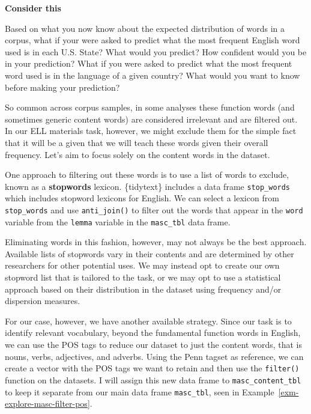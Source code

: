 \documentclass[
  letterpaper,
  krantz1]{latex/krantz-mod}
\theoremstyle{definition}
\theoremstyle{definition}
\theoremstyle{remark}
\begin{document}
\begin{tcolorbox}[enhanced jigsaw, toprule=.15mm, breakable, colback=white, arc=.35mm, left=2mm, colframe=quarto-callout-color-frame, opacityback=0, bottomrule=.15mm, rightrule=.15mm, leftrule=.75mm]

\textbf{ Consider this}

Based on what you now know about the expected distribution of words in a
corpus, what if your were asked to predict what the most frequent
English word used is in each U.S. State? What would you predict? How
confident would you be in your prediction? What if you were asked to
predict what the most frequent word used is in the language of a given
country? What would you want to know before making your prediction?

\end{tcolorbox}

So common across corpus samples, in some analyses these function words
(and sometimes generic content words) are considered irrelevant and are
filtered out. In our ELL materials task, however, we might exclude them
for the simple fact that it will be a given that we will teach these
words given their overall frequency. Let's aim to focus solely on the
content words in the dataset.

One approach to filtering out these words is to use a list of words to
exclude, known as a \textbf{stopwords} lexicon.
\{tidytext\} includes a data frame \texttt{stop\_words} which includes
stopword lexicons for English. We can select a lexicon from
\texttt{stop\_words} and use \texttt{anti\_join()} to filter out the
words that appear in the \texttt{word} variable from the \texttt{lemma}
variable in the \texttt{masc\_tbl} data
frame.

Eliminating words in this fashion, however, may not always be the best
approach. Available lists of stopwords vary in their contents and are
determined by other researchers for other potential uses. We may instead
opt to create our own stopword list that is tailored to the task, or we
may opt to use a statistical approach based on their distribution in the
dataset using frequency and/or dispersion measures.

For our case, however, we have another available strategy. Since our
task is to identify relevant vocabulary, beyond the fundamental function
words in English, we can use the POS tags to reduce our dataset to just
the content words, that is nouns, verbs, adjectives, and
adverbs. Using the Penn tagset as
reference, we can create a vector with the POS tags we want to retain
and then use the \texttt{filter()} function on the datasets. I will
assign this new data frame to \texttt{masc\_content\_tbl} to keep it
separate from our main data frame \texttt{masc\_tbl}, seen in
Example~\ref{exm-explore-masc-filter-pos}.
\end{document}
